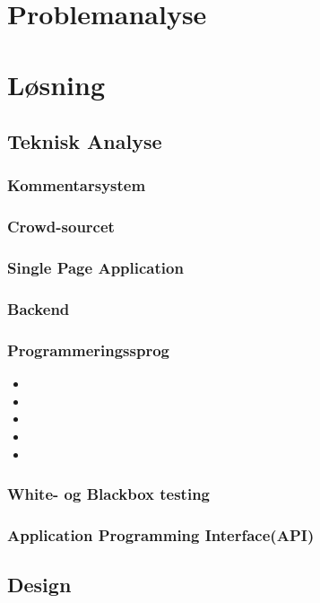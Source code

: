 \documentclass[final]{rapport1}
\begin{document}
\clearpage
\chapter{Problemanalyse}

\chapter{Løsning}
\section{Teknisk Analyse}
\subsection{Kommentarsystem}


\subsection{Crowd-sourcet}

\subsection{Single Page Application}

\subsection{Backend}

\subsection{Programmeringssprog}
\begin{itemize}
\item 
\item 
\item 
\item 
\item 
\end{itemize}

\subsection{White- og Blackbox testing}

\subsection{Application Programming Interface(API)}
\clearpage
\section{Design}
\end{document}
